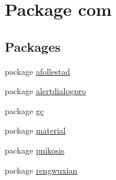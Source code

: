 \hypertarget{namespacecom}{}\section{Package com}
\label{namespacecom}
\subsection*{Packages}
\begin{DoxyCompactItemize}
\item 
package \hyperlink{namespacecom_1_1afollestad}{afollestad}
\item 
package \hyperlink{namespacecom_1_1alertdialogpro}{alertdialogpro}
\item 
package \hyperlink{namespacecom_1_1gc}{gc}
\item 
package \hyperlink{namespacecom_1_1material}{material}
\item 
package \hyperlink{namespacecom_1_1pnikosis}{pnikosis}
\item 
package \hyperlink{namespacecom_1_1rengwuxian}{rengwuxian}
\end{DoxyCompactItemize}
